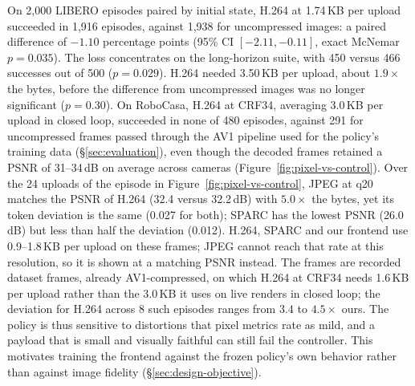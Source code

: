 On 2,000 LIBERO episodes paired by initial state, H.264 at 1.74\,KB per
upload succeeded in 1,916 episodes, against 1,938 for uncompressed images:
a paired difference of $-1.10$ percentage points (95\% CI
$[-2.11,-0.11]$, exact McNemar $p=0.035$). The loss concentrates on the
long-horizon suite, with 450 versus 466 successes out of 500 ($p=0.029$).
H.264 needed 3.50\,KB per upload, about $1.9\times$ the bytes, before the
difference from uncompressed images was no longer significant
($p=0.30$). On RoboCasa, H.264 at CRF34, averaging 3.0\,KB per upload in closed
loop, succeeded in none of 480 episodes, against 291 for uncompressed frames passed through the AV1 pipeline used
for the policy's training data (\S\ref{sec:evaluation}), even though the decoded frames
retained a PSNR of 31--34\,dB on average across cameras
(Figure~\ref{fig:pixel-vs-control}). Over the 24 uploads of the episode in
Figure~\ref{fig:pixel-vs-control}, JPEG at q20 matches the PSNR of H.264
(32.4 versus 32.2\,dB) with $5.0\times$ the bytes, yet its token
deviation is the same (0.027 for both); SPARC has the lowest PSNR
(26.0\,dB) but less than half the deviation (0.012). H.264, SPARC and our frontend use
0.9--1.8\,KB per upload on these frames; JPEG cannot reach that rate at
this resolution, so it is shown at a matching PSNR instead. The frames are
recorded dataset frames, already AV1-compressed, on which H.264 at CRF34
needs 1.6\,KB per upload rather than the 3.0\,KB it uses on live renders
in closed loop; the deviation for H.264 across 8 such episodes ranges from
$3.4$ to $4.5\times$ ours. The policy is thus sensitive to
distortions that pixel metrics rate as mild, and a payload that is
small and visually faithful can still fail the controller. This motivates
training the frontend against the frozen policy's own behavior rather than
against image fidelity (\S\ref{sec:design-objective}).

